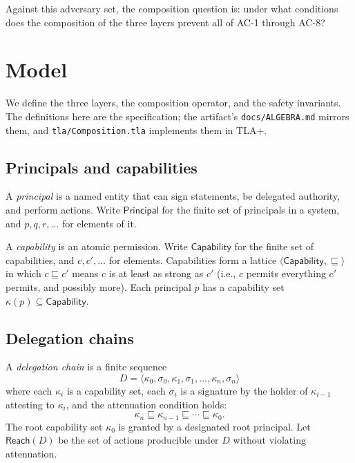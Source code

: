 \documentclass[11pt,a4paper]{article}
\theoremstyle{plain}
\theoremstyle{definition}
\theoremstyle{remark}
\begin{document}
Against this adversary set, the composition question is: under what conditions
does the composition of the three layers prevent all of AC-1 through AC-8?

\section{Model}
\label{sec:model}

We define the three layers, the composition operator, and the safety
invariants. The definitions here are the specification; the artifact's
\texttt{docs/ALGEBRA.md} mirrors them, and
\texttt{tla/Composition.tla} implements them in TLA+.

\subsection{Principals and capabilities}

A \emph{principal} is a named entity that can sign statements, be delegated
authority, and perform actions. Write $\mathsf{Principal}$ for the finite set
of principals in a system, and $p, q, r, \ldots$ for elements of it.

A \emph{capability} is an atomic permission. Write $\mathsf{Capability}$ for
the finite set of capabilities, and $c, c', \ldots$ for elements. Capabilities
form a lattice $\langle \mathsf{Capability}, \sqsubseteq \rangle$ in which
$c \sqsubseteq c'$ means $c$ is at least as strong as $c'$ (i.e., $c$ permits
everything $c'$ permits, and possibly more). Each principal $p$ has a
capability set $\kappa(p) \subseteq \mathsf{Capability}$.

\subsection{Delegation chains}

A \emph{delegation chain} is a finite sequence
\begin{equation*}
D = \langle \kappa_0, \sigma_0, \kappa_1, \sigma_1, \ldots, \kappa_n, \sigma_n \rangle
\end{equation*}
where each $\kappa_i$ is a capability set, each $\sigma_i$ is a signature by
the holder of $\kappa_{i-1}$ attesting to $\kappa_i$, and the attenuation
condition holds:
\begin{equation*}
\kappa_n \sqsubseteq \kappa_{n-1} \sqsubseteq \cdots \sqsubseteq \kappa_0.
\end{equation*}
The root capability set $\kappa_0$ is granted by a designated root principal.
Let $\mathsf{Reach}(D)$ be the set of actions producible under $D$ without
violating attenuation.
\end{document}
